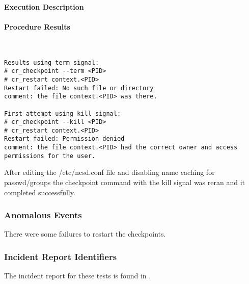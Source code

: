 \paragraph{Execution Description}

\paragraph{Procedure Results}
~\\

\begin{lstlisting}
Results using term signal:
# cr_checkpoint --term <PID>
# cr_restart context.<PID>
Restart failed: No such file or directory
comment: the file context.<PID> was there.

First attempt using kill signal:
# cr_checkpoint --kill <PID>
# cr_restart context.<PID>
Restart failed: Permission denied
comment: the file context.<PID> had the correct owner and access permissions for the user.
\end{lstlisting}

After editing the /etc/ncsd.conf file and disabling name caching for passwd/groups the checkpoint command with the kill signal was reran and it completed successfully.




\subsubsection{Anomalous Events}
There were some failures to restart the checkpoints.

\subsubsection{Incident Report Identifiers}
The incident report for these tests is found in .